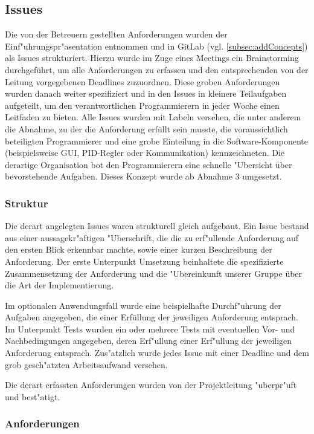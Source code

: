 \documentclass[oneside,abstractoff,a4paper]{scrartcl}
\begin{document}
\subsection{Issues}
Die von der Betreuern gestellten Anforderungen wurden der Einf"uhrungspr"asentation entnommen und in GitLab (vgl. \cref{subsec:addConcepts}) als Issues strukturiert. Hierzu wurde im Zuge eines Meetings ein Brainstorming durchgeführt, um alle Anforderungen zu erfassen und den entsprechenden von der Leitung vorgegebenen Deadlines zuzuordnen. Diese groben Anforderungen wurden danach weiter spezifiziert und in den Issues in kleinere Teilaufgaben aufgeteilt, um den verantwortlichen Programmierern in jeder Woche einen Leitfaden zu bieten. Alle Issues wurden mit Labeln versehen, die unter anderem die Abnahme, zu der die Anforderung erfüllt sein musste, die voraussichtlich beteiligten Programmierer und eine grobe Einteilung in die Software-Komponente (beispielsweise GUI, PID-Regler oder Kommunikation) kennzeichneten. Die derartige Organisation bot den Programmierern eine schnelle "Ubersicht über bevorstehende Aufgaben. Dieses Konzept wurde ab Abnahme 3 umgesetzt.

\subsubsection{Struktur}
Die derart angelegten Issues waren strukturell gleich aufgebaut. Ein Issue bestand aus einer aussagekr"aftigen "Uberschrift, die die zu erf"ullende Anforderung auf den ersten Blick erkennbar machte, sowie einer kurzen Beschreibung der Anforderung. Der erste Unterpunkt Umsetzung beinhaltete die spezifizierte Zusammensetzung der Anforderung und die "Ubereinkunft unserer Gruppe über die Art der Implementierung.

Im optionalen Anwendungsfall wurde eine beispielhafte Durchf"uhrung der Aufgaben angegeben, die einer Erfüllung der jeweiligen Anforderung entsprach. Im Unterpunkt Tests wurden ein oder mehrere Tests mit eventuellen Vor- und Nachbedingungen angegeben, deren Erf"ullung einer Erf"ullung der jeweiligen Anforderung entsprach. Zus"atzlich wurde jedes Issue mit einer Deadline und dem grob gesch"atzten Arbeitsaufwand versehen.

Die derart erfassten Anforderungen wurden von der Projektleitung "uberpr"uft und best"atigt.

\subsubsection{Anforderungen}
\end{document}
